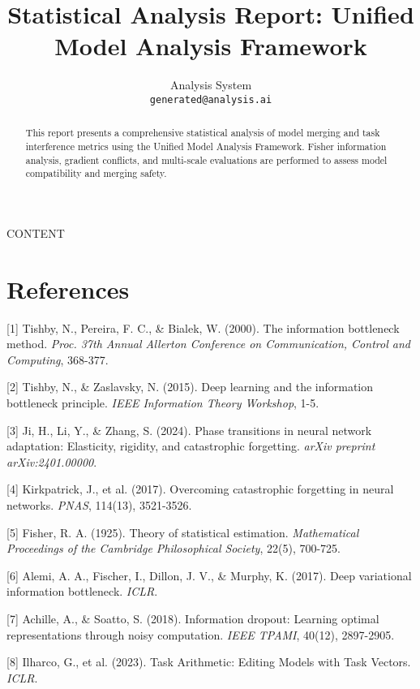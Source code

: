 \documentclass{article}
\title{Statistical Analysis Report: Unified Model Analysis Framework}
\author{
  Analysis System \\
  \texttt{generated@analysis.ai} \\
}
\begin{document}
\maketitle

\begin{abstract}
This report presents a comprehensive statistical analysis of model merging and task interference metrics using the Unified Model Analysis Framework. Fisher information analysis, gradient conflicts, and multi-scale evaluations are performed to assess model compatibility and merging safety.
\end{abstract}

{{ CONTENT }}

\section*{References}
\small

[1] Tishby, N., Pereira, F. C., \& Bialek, W. (2000). The information bottleneck method. \textit{Proc. 37th Annual Allerton Conference on Communication, Control and Computing}, 368-377.

[2] Tishby, N., \& Zaslavsky, N. (2015). Deep learning and the information bottleneck principle. \textit{IEEE Information Theory Workshop}, 1-5.

[3] Ji, H., Li, Y., \& Zhang, S. (2024). Phase transitions in neural network adaptation: Elasticity, rigidity, and catastrophic forgetting. \textit{arXiv preprint arXiv:2401.00000}.

[4] Kirkpatrick, J., et al. (2017). Overcoming catastrophic forgetting in neural networks. \textit{PNAS}, 114(13), 3521-3526.

[5] Fisher, R. A. (1925). Theory of statistical estimation. \textit{Mathematical Proceedings of the Cambridge Philosophical Society}, 22(5), 700-725.

[6] Alemi, A. A., Fischer, I., Dillon, J. V., \& Murphy, K. (2017). Deep variational information bottleneck. \textit{ICLR}.

[7] Achille, A., \& Soatto, S. (2018). Information dropout: Learning optimal representations through noisy computation. \textit{IEEE TPAMI}, 40(12), 2897-2905.

[8] Ilharco, G., et al. (2023). Task Arithmetic: Editing Models with Task Vectors. \textit{ICLR}.
\end{document}
